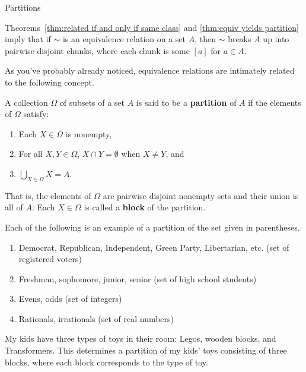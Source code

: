 \begin{section}{Partitions}

Theorems~\ref{thm:related if and only if same class} and \ref{thm:equiv yields partition} imply that if $\sim$ is an equivalence relation on a set $A$, then $\sim$ breaks $A$ up into pairwise disjoint chunks, where each chunk is some $[a]$ for $a\in A$. %

As you've probably already noticed, equivalence relations are intimately related to the following concept.

\begin{definition}\label{def:partition}
A collection $\Omega$ of subsets of a set $A$ is said to be a \textbf{partition} of $A$ if the elements of $\Omega$ satisfy:
\begin{enumerate}[label=\textrm{(\alph*)}]
\item Each $X\in \Omega$ is nonempty,
\item For all $X,Y\in\Omega$, $X\cap Y=\emptyset$ when $X\neq Y$, and
\item $\displaystyle \bigcup_{X\in\Omega}X=A$.
\end{enumerate}
That is, the elements of $\Omega$ are pairwise disjoint nonempty sets and their union is all of $A$. Each $X\in \Omega$ is called a \textbf{block} of the partition.
\end{definition}

\begin{example}
Each of the following is an example of a partition of the set given in parentheses.  %
\begin{enumerate}[label=\textrm{(\alph*)}]
\item Democrat, Republican, Independent, Green Party, Libertarian, etc. (set of registered voters)
\item Freshman, sophomore, junior, senior (set of high school students)
\item Evens, odds (set of integers)
\item Rationals, irrationals (set of real numbers)
\end{enumerate}
\end{example}

\begin{example}\label{ex:toys}
My kids have three types of toys in their room: Legos, wooden blocks, and Transformers.  This determines a partition of my kids' toys consisting of three blocks, where each block corresponds to the type of toy.
\end{example}


\end{section}
